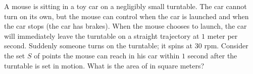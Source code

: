 A mouse is sitting in a toy car on a negligibly small turntable. The car cannot turn on its own, but the mouse can control when the car is launched and when the car stops (the car has brakes). When the mouse chooses to launch, the car will immediately leave the turntable on a straight trajectory at $1$ meter per second. Suddenly someone turns on the turntable; it spins at $30$ rpm. Consider the set $S$ of points the mouse can reach in his car within $1$ second after the turntable is set in motion. What is the area of  in square meters?
